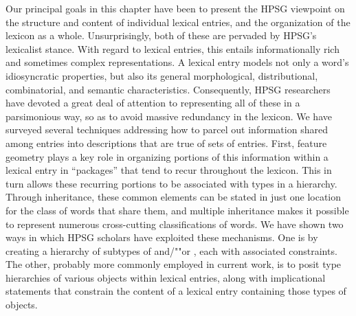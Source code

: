 \documentclass[output=paper,biblatex,babelshorthands,newtxmath,draftmode,colorlinks,citecolor=brown]{langscibook}
\begin{document}
Our principal goals in this chapter have been to present the HPSG viewpoint on the structure and content of individual lexical entries, and the organization of the lexicon as a whole.
Unsurprisingly, both of these are pervaded by HPSG's lexicalist stance.
With regard to lexical entries, this entails informationally rich and sometimes complex representations. 
A lexical entry models not only a word's idiosyncratic properties, but also its general morphological, distributional, combinatorial, and semantic characteristics.
Consequently, HPSG researchers have devoted a great deal of attention to representing all of these in a parsimonious way, so as to avoid massive redundancy in the lexicon.
We have surveyed several techniques addressing how to parcel out information shared among entries into descriptions that are true of sets of entries.
First, feature geometry plays a key role in organizing portions of this information within a lexical entry in ``packages'' that tend to recur throughout the lexicon.
This in turn allows these recurring portions to be associated with types in a hierarchy.
Through inheritance, these common elements can be stated in just one location for the class of words that share them, and multiple inheritance makes it possible to represent numerous cross-cutting classifications of words.
We have shown two ways in which HPSG scholars have exploited these mechanisms.
One is by creating a hierarchy of subtypes of  and/""or , each with associated constraints.
The other, probably more commonly employed in current work, is to posit type hierarchies of various objects within lexical entries, along with implicational statements that constrain the content of a lexical entry containing those types of objects.
\end{document}
